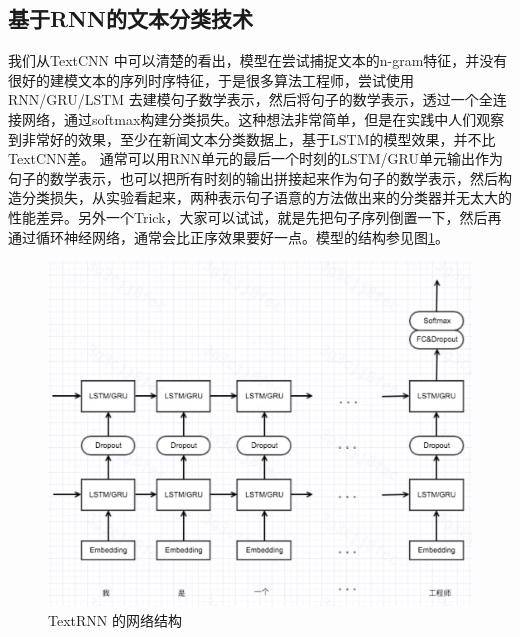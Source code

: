 \documentclass[twoside,a4paper,12pt]{book}%
\begin{document}
\subsection{基于RNN的文本分类技术}
我们从TextCNN 中可以清楚的看出，模型在尝试捕捉文本的n-gram特征，并没有很好的建模文本的序列时序特征，于是很多算法工程师，尝试使用\gls{RNN}/\gls{GRU}/\gls{LSTM} 去建模句子数学表示，然后将句子的数学表示，透过一个全连接网络，通过softmax构建分类损失。这种想法非常简单，但是在实践中人们观察到非常好的效果，至少在新闻文本分类数据上，基于\gls{LSTM}的模型效果，并不比TextCNN差。
通常可以用\gls{RNN}单元的最后一个时刻的\gls{LSTM}/\gls{GRU}单元输出作为句子的数学表示，也可以把所有时刻的输出拼接起来作为句子的数学表示，然后构造分类损失，从实验看起来，两种表示句子语意的方法做出来的分类器并无太大的性能差异。另外一个Trick，大家可以试试，就是先把句子序列倒置一下，然后再通过循环神经网络，通常会比正序效果要好一点。模型的结构参见图\ref{fig:textrnn1}。
\begin{figure}[htbp]
\begin{center}
\includegraphics[width=5.6in]{figures/textrnn1.png}
\caption{TextRNN 的网络结构}\label{fig:textrnn1}
\end{center}
\end{figure}
\end{document}
